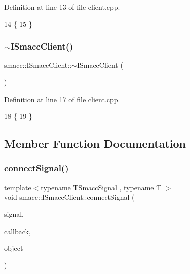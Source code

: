 Definition at line 13 of file client.\+cpp.


\begin{DoxyCode}
14 \{
15 \}
\end{DoxyCode}
\mbox{\label{classsmacc_1_1ISmaccClient_a030e17771bf2e404a6fad97273c4d7f4}} 
\subsubsection{\texorpdfstring{$\sim$\+I\+Smacc\+Client()}{~ISmaccClient()}}
{\footnotesize\ttfamily smacc\+::\+I\+Smacc\+Client\+::$\sim$\+I\+Smacc\+Client (\begin{DoxyParamCaption}{ }\end{DoxyParamCaption})\hspace{0.3cm}{\ttfamily [virtual]}}



Definition at line 17 of file client.\+cpp.


\begin{DoxyCode}
18 \{
19 \}
\end{DoxyCode}


\subsection{Member Function Documentation}
\mbox{\label{classsmacc_1_1ISmaccClient_addce4ebcdebc5a7a3f80c0980862575d}} 
\subsubsection{\texorpdfstring{connect\+Signal()}{connectSignal()}}
{\footnotesize\ttfamily template$<$typename T\+Smacc\+Signal , typename T $>$ \\
void smacc\+::\+I\+Smacc\+Client\+::connect\+Signal (\begin{DoxyParamCaption}\item[{T\+Smacc\+Signal \&}]{signal,  }\item[{void(T\+::$\ast$)()}]{callback,  }\item[{T $\ast$}]{object }\end{DoxyParamCaption})}




